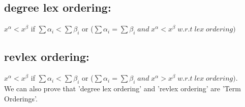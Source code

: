 \subsection*{degree lex ordering:}
$x^{\alpha}<x^{\beta}$ if $\sum\alpha_{i}<\sum\beta_{i}$ or ($\sum\alpha_{i}=\sum\beta_{i}\; and\; x^{\alpha}<x^{\beta}\; w.r.t \;lex\; ordering)$
\subsection*{revlex ordering:}
$x^{\alpha}<x^{\beta}$ if $\sum\alpha_{i}<\sum\beta_{i}$ or ($\sum\alpha_{i}=\sum\beta_{i}\; and\; x^{\alpha}>x^{\beta}\; w.r.t\; lex \;ordering)$.
$$$$
We can also prove that 'degree lex ordering' and 'revlex ordering' are 'Term Orderings'.

